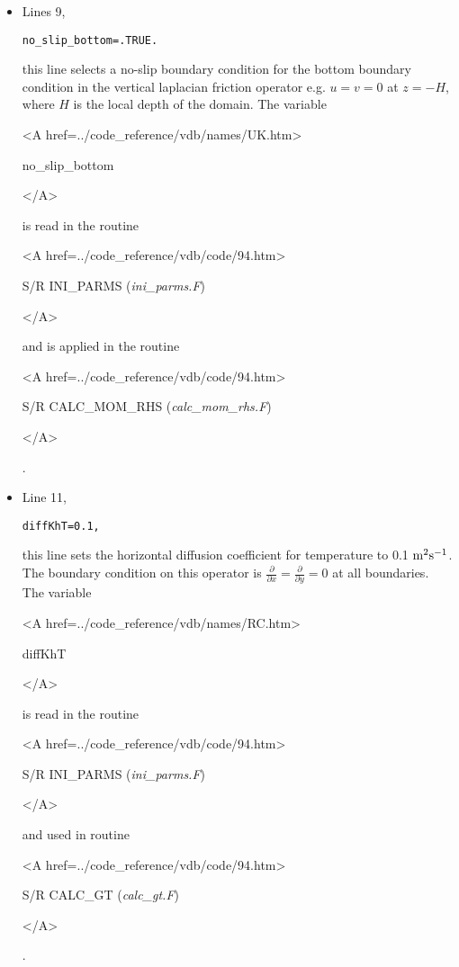 \begin{itemize}
\item Lines 9,
\begin{verbatim}
no_slip_bottom=.TRUE.
\end{verbatim}
this line selects a no-slip boundary condition for the bottom
boundary condition in the vertical laplacian friction operator 
e.g. $u=v=0$ at $z=-H$, where $H$ is the local depth of the domain.
The variable
{\bf
\begin{rawhtml} <A href=../code_reference/vdb/names/UK.htm> \end{rawhtml}
no\_slip\_bottom
\begin{rawhtml} </A>\end{rawhtml}
}
is read in the routine
{\it
\begin{rawhtml} <A href=../code_reference/vdb/code/94.htm> \end{rawhtml}
S/R INI\_PARMS ({\it ini\_parms.F})
\begin{rawhtml} </A>\end{rawhtml}
} and is applied in the routine 
{\it 
\begin{rawhtml} <A href=../code_reference/vdb/code/94.htm> \end{rawhtml}
S/R CALC\_MOM\_RHS ({\it calc\_mom\_rhs.F})
\begin{rawhtml} </A>\end{rawhtml}
}.

\item Line 11,
\begin{verbatim}
diffKhT=0.1,
\end{verbatim}
this line sets the horizontal diffusion coefficient for temperature
to 0.1 $\rm m^{2}s^{-1}$. The boundary condition on this
operator is $\frac{\partial}{\partial x}=\frac{\partial}{\partial y}=0$ at
all boundaries.
The variable
{\bf
\begin{rawhtml} <A href=../code_reference/vdb/names/RC.htm> \end{rawhtml}
diffKhT
\begin{rawhtml} </A>\end{rawhtml}
}
is read in the routine
{\it
\begin{rawhtml} <A href=../code_reference/vdb/code/94.htm> \end{rawhtml}
S/R INI\_PARMS ({\it ini\_parms.F})
\begin{rawhtml} </A>\end{rawhtml}
} and used in routine 
{\it
\begin{rawhtml} <A href=../code_reference/vdb/code/94.htm> \end{rawhtml}
S/R CALC\_GT ({\it calc\_gt.F})
\begin{rawhtml} </A>\end{rawhtml}
}.


\end{itemize}
